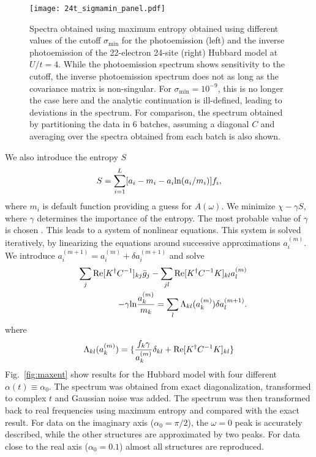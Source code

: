 \begin{figure*}[t!]
\texttt{[image: 24t\_sigmamin\_panel.pdf]}
\caption{Spectra obtained using maximum entropy obtained using different
  values of the cutoff $\sigma_\text{min}$ for the photoemission (left) and the inverse photoemission of the 22-electron 24-site (right) Hubbard model at
  $U/t=4$. While the photoemission spectrum shows sensitivity to the cutoff, the
inverse photoemission spectrum does not as long as the covariance matrix is
non-singular. For $\sigma_\text{min}= 10^{-9}$, this is no longer the case here
and the analytic continuation is ill-defined, leading to deviations in the
spectrum. For comparison, the spectrum obtained by partitioning the data in 6
batches, assuming a diagonal $C$ and averaging over the spectra obtained from
each batch is also shown.}
\label{fig:sigmamin}
\end{figure*}

We also introduce the entropy $S$ 
\begin{equation}\label{eq:11}
S=\sum_{i=1}^L[a_i-m_i-a_i{\rm ln}(a_i/m_i)]f_i,
\end{equation}
where $m_i$ is default function providing a guess for $A(\omega)$.
We minimize $\chi-\gamma S$, where $\gamma$ determines the importance of the entropy.
The most probable value of $\gamma$ is chosen \cite{maxent,Jarrell}.
This leads to a system of nonlinear equations.
This system is solved iteratively, by linearizing the equations around successive approximations $a^{(m)}_i$.
We introduce $a_i^{(m+1)}=a_i^{(m)}+\delta a_i^{(m+1)}$ and solve 
\begin{eqnarray}\label{eq:16}
&&\sum_j {\rm Re} [K^{\dagger}C^{-1}]_{kj}{\bar g}_j-\sum_{jl} {\rm Re} [K^{\dagger}C^{-1}K]_{kl}a^{(m)}_l \nonumber \\
&& -\gamma{\rm ln} { a_k^{(m)}\over m_k} =\sum_{l} \Lambda_{kl}(a_k^{(m)})\delta a_l^{(m+1)}. 
\end{eqnarray}
where 
\begin{equation}\label{eq:maxent10} 
\Lambda_{kl}(a_k^{(m)})=\lbrace {f_k\gamma\over a_k^{(m)}}\delta_{kl}+ {\rm Re} [K^{\dagger}C^{-1}K]_{kl} \rbrace
\end{equation}
Fig.~\ref{fig:maxent} show results for the Hubbard model with four different $\alpha(t)\equiv \alpha_0$.
The spectrum was obtained from exact diagonalization, transformed to complex $t$ and Gaussian noise was added.
The spectrum was then transformed back to real frequencies using maximum entropy and compared with the exact result.
For data on the imaginary axis ($\alpha_0=\pi/2$), the $\omega=0$ peak is accurately described, while the other structures 
are approximated by two peaks. For data close to the real axis ($\alpha_0=0.1$) almost all structures are reproduced.

